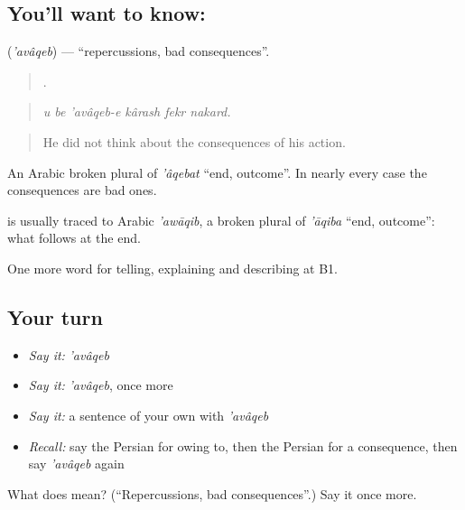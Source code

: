 \subsection*{You'll want to know: }
\textbf{} (\emph{'avâqeb}) — \textquotedblleft{}repercussions, bad consequences\textquotedblright{}.

\begin{quote}
     .
\end{quote}

\begin{quote}
\emph{u be 'avâqeb-e kârash fekr nakard.}
\end{quote}

\begin{quote}
He did not think about the consequences of his action.
\end{quote}

An Arabic broken plural of \emph{'âqebat} \textquotedblleft{}end, outcome\textquotedblright{}. In nearly every case the consequences are bad ones.

\begin{cousinweb}
\textbf{} is usually traced to Arabic \emph{'awāqib}, a broken plural of \emph{'āqiba} \textquotedblleft{}end, outcome\textquotedblright{}: what follows at the end.
\end{cousinweb}

\begin{grammarlens}[title={What you've built}]
One more word for telling, explaining and describing at B1.
\end{grammarlens}

\subsection*{Your turn}
\begin{itemize}
\raggedright
  \item \emph{Say it:} \emph{'avâqeb}
  \item \emph{Say it:} \emph{'avâqeb}, once more
  \item \emph{Say it:} a sentence of your own with \emph{'avâqeb}
  \item \emph{Recall:} say the Persian for owing to, then the Persian for a consequence, then say \emph{'avâqeb} again
\end{itemize}

\begin{tcolorbox}[breakable,colback=teal!4,colframe=teal!35!black,title={Before you move on}]
What does  mean? (\textquotedblleft{}Repercussions, bad consequences\textquotedblright{}.) Say it once more.
\end{tcolorbox}
